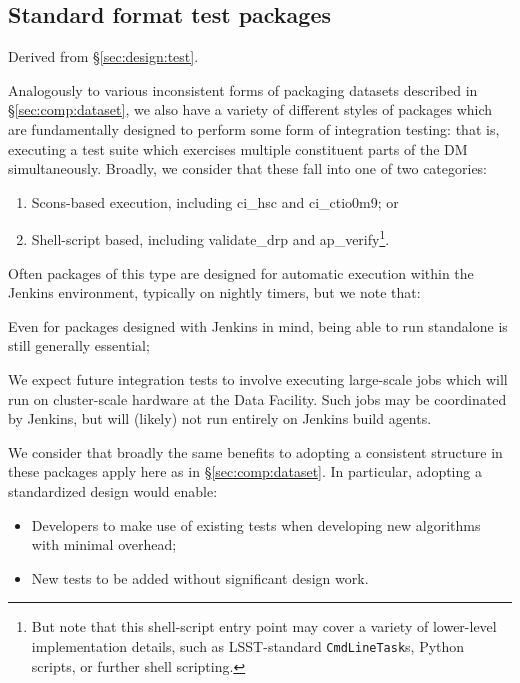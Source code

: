 \subsection{Standard format test packages}
\label{sec:comp:test_pkg}

Derived from \S\ref{sec:design:test}.

Analogously to various inconsistent forms of packaging datasets described in \S\ref{sec:comp:dataset}, we also have a variety of different styles of packages which are fundamentally designed to perform some form of integration testing: that is, executing a test suite which exercises multiple constituent parts of the DM simultaneously.
Broadly, we consider that these fall into one of two categories:

\begin{enumerate}
    \item{Scons-based execution, including ci\_hsc and ci\_ctio0m9; or}
    \item{Shell-script based, including validate\_drp and ap\_verify\footnote{But note that this shell-script entry point may cover a variety of lower-level implementation details, such as LSST-standard \texttt{CmdLineTask}s, Python scripts, or further shell scripting.}.}
\end{enumerate}

Often packages of this type are designed for automatic execution within the Jenkins environment, typically on nightly timers, but we note that:

\begin{itemize_single}
    \item{Even for packages designed with Jenkins in mind, being able to run standalone is still generally essential;}
    \item{We expect future integration tests to involve executing large-scale jobs which will run on cluster-scale hardware at the Data Facility. Such jobs may be coordinated by Jenkins, but will (likely) not run entirely on Jenkins build agents.}
\end{itemize_single}

We consider that broadly the same benefits to adopting a consistent structure in these packages apply here as in \S\ref{sec:comp:dataset}.
In particular, adopting a standardized design would enable:

\begin{itemize}
    \item{Developers to make use of existing tests when developing new algorithms with minimal overhead;}
    \item{New tests to be added without significant design work.}
\end{itemize}

